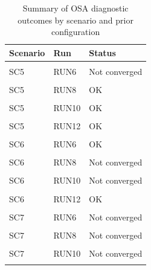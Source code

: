 \documentclass[
  12pt,
]{article}
\begin{document}
\begin{table}[!h]
\centering
\caption{\label{tab:retrosummary}Summary of OSA diagnostic outcomes by scenario and prior configuration}
\centering
\fontsize{8}{10}\selectfont
\begin{tabular}[t]{lll}
\toprule
Scenario & Run & Status\\
\midrule
\cellcolor{gray!10}{SC5} & \cellcolor{gray!10}{RUN5} & \cellcolor{gray!10}{Not converged}\\
SC5 & RUN6 & Not converged\\
\cellcolor{gray!10}{SC5} & \cellcolor{gray!10}{RUN7} & \cellcolor{gray!10}{Not converged}\\
SC5 & RUN8 & OK\\
\cellcolor{gray!10}{SC5} & \cellcolor{gray!10}{RUN9} & \cellcolor{gray!10}{OK}\\
\addlinespace
SC5 & RUN10 & OK\\
\cellcolor{gray!10}{SC5} & \cellcolor{gray!10}{RUN11} & \cellcolor{gray!10}{OK}\\
SC5 & RUN12 & OK\\
\cellcolor{gray!10}{SC6} & \cellcolor{gray!10}{RUN5} & \cellcolor{gray!10}{Not converged}\\
SC6 & RUN6 & OK\\
\addlinespace
\cellcolor{gray!10}{SC6} & \cellcolor{gray!10}{RUN7} & \cellcolor{gray!10}{Not converged}\\
SC6 & RUN8 & Not converged\\
\cellcolor{gray!10}{SC6} & \cellcolor{gray!10}{RUN9} & \cellcolor{gray!10}{OK}\\
SC6 & RUN10 & Not converged\\
\cellcolor{gray!10}{SC6} & \cellcolor{gray!10}{RUN11} & \cellcolor{gray!10}{OK}\\
\addlinespace
SC6 & RUN12 & OK\\
\cellcolor{gray!10}{SC7} & \cellcolor{gray!10}{RUN5} & \cellcolor{gray!10}{Not converged}\\
SC7 & RUN6 & Not converged\\
\cellcolor{gray!10}{SC7} & \cellcolor{gray!10}{RUN7} & \cellcolor{gray!10}{Not converged}\\
SC7 & RUN8 & Not converged\\
\addlinespace
\cellcolor{gray!10}{SC7} & \cellcolor{gray!10}{RUN9} & \cellcolor{gray!10}{OK}\\
SC7 & RUN10 & Not converged\\
\cellcolor{gray!10}{SC7} & \cellcolor{gray!10}{RUN11} & \cellcolor{gray!10}{OK}\\

\end{tabular}
\end{table}
\end{document}
